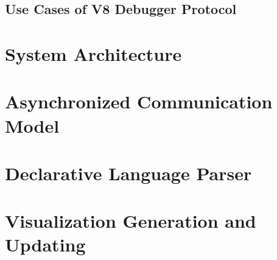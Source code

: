 \subsection {Use Cases of V8 Debugger Protocol}

\section {System Architecture}

\section {Asynchronized Communication Model}

\section {Declarative Language Parser}

\section {Visualization Generation and Updating}
